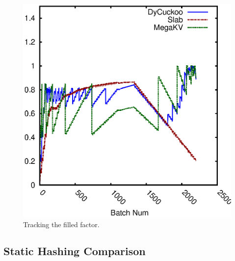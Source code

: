 \begin{figure}[htp]
\begin{minipage}{0.19\linewidth}
		\centerline{\dsali}
	\end{minipage}
	\begin{minipage}{0.19\linewidth}\centering
		\includegraphics[width=\linewidth]{pic/dynamic-load_factor/random/batch_LoadFactor-2.eps}
		\centerline{\dsrandom}
	\end{minipage}
	\caption{Tracking the filled factor.}
	\label{fig:track-stability}
\end{figure}

\subsection{Static Hashing Comparison}\label{sec:exp:static}

